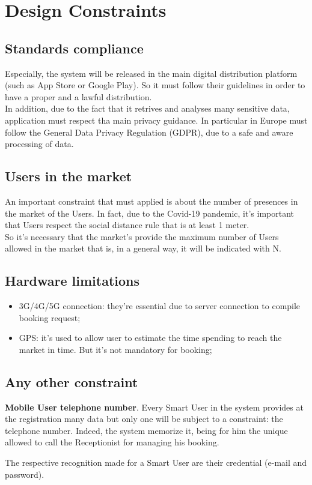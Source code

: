 \section{Design Constraints}
\subsection{Standards compliance}
Especially, the system will be released in the main digital distribution platform (such as App Store or Google Play). So it must follow their guidelines in order to have a proper and a lawful distribution. \\
In addition, due to the fact that it retrives and analyses many sensitive data, application must respect tha main privacy guidance. In particular in Europe must follow the General Data Privacy Regulation (GDPR), due to a safe and aware processing of data. 
\par
\subsection{Users in the market}
An important constraint that must applied is about the number of presences in the market of the Users. In fact, due to the Covid-19 pandemic, it's important that Users respect the social distance rule that is at least 1 meter.\\
So it's necessary that the market's provide the maximum number of Users allowed in the market that is, in a general way, it will be indicated with N.
\par
\subsection{Hardware limitations}
\begin{itemize}
\item 3G/4G/5G connection: they're essential due to server connection to compile booking request;
\item GPS: it's used to allow user to estimate the time spending to reach the market in time. But it's not mandatory for booking;
\end{itemize}
\subsection{Any other constraint}

\textbf{Mobile User telephone number}. Every Smart User in the system provides at the registration many data but only one will be subject to a constraint: the telephone number. Indeed, the system memorize it, being for him the unique allowed to call the Receptionist for managing his booking. \par
The respective recognition made for a Smart User are their credential (e-mail and password).


